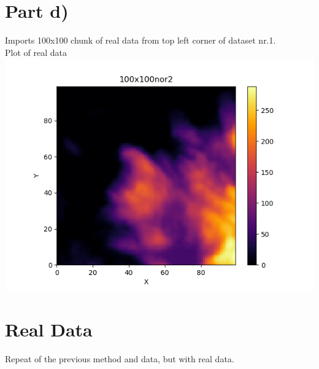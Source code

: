\documentclass[a4paper,norsk]{article}
\begin{document}
\section*{Part d)}
Imports 100x100 chunk of real data from top left corner of dataset nr.1.
\\Plot of real data
\\ \includegraphics[scale=.7]{100x100nor2}
\clearpage
\section*{Real Data}
Repeat of the previous method and data, but with real data.
\end{document}
